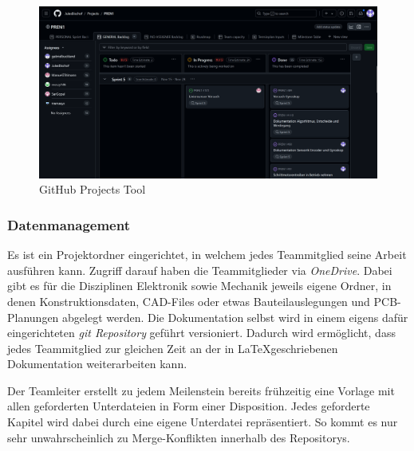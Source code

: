 \documentclass[main.tex]{subfiles} %
\begin{document}
\begin{figure}[h!]
    \centering
    \includegraphics[page=1, width=1\textwidth]{./fig_Projektmanagement/Ansicht_GitHubProjects.png}
    \caption{GitHub Projects Tool}\label{fig:GitHubProjectsTool}
\end{figure}

\subsubsection*{Datenmanagement}
Es ist ein Projektordner eingerichtet, in welchem jedes Teammitglied seine Arbeit ausführen kann. Zugriff darauf
haben die Teammitglieder via \textit{OneDrive}.
Dabei gibt es für die Disziplinen Elektronik sowie Mechanik jeweils eigene Ordner, in denen Konstruktionsdaten,
CAD-Files oder etwas Bauteilauslegungen und PCB-Planungen abgelegt werden. Die Dokumentation
selbst wird in einem eigens dafür eingerichteten \textit{git Repository} geführt versioniert.
Dadurch wird ermöglicht, dass jedes Teammitglied zur gleichen Zeit an der in \LaTeX geschriebenen
Dokumentation weiterarbeiten kann.

Der Teamleiter erstellt zu jedem Meilenstein bereits frühzeitig eine Vorlage
mit allen geforderten Unterdateien in Form einer Disposition. Jedes geforderte
Kapitel wird dabei durch eine eigene Unterdatei repräsentiert. So kommt es nur
sehr unwahrscheinlich zu Merge-Konflikten innerhalb des Repositorys.
\end{document}
